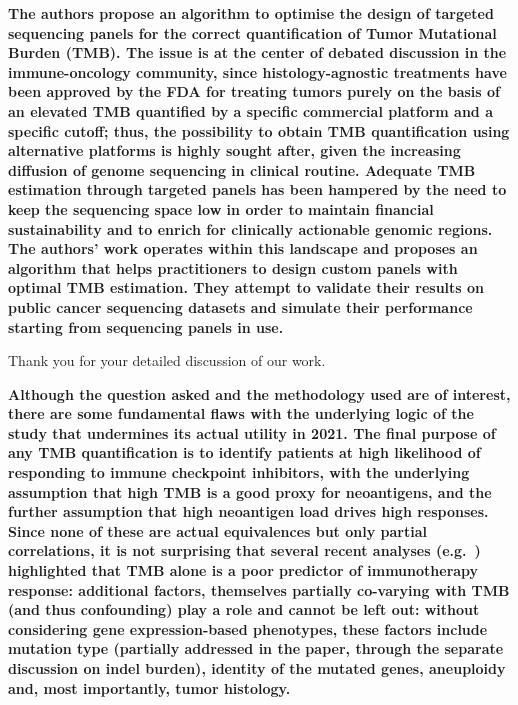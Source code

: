 \documentclass[12pt]{article}
\begin{document}
\textbf{The authors propose an algorithm to optimise the design of targeted sequencing panels for the correct quantification of Tumor Mutational Burden (TMB). The issue is at the center of debated discussion in the immune-oncology community, since histology-agnostic treatments have been approved by the FDA for treating tumors purely on the basis of an elevated TMB quantified by a specific commercial platform and a specific cutoff; thus, the possibility to obtain TMB quantification using alternative platforms is highly sought after, given the increasing diffusion of genome sequencing in clinical routine. Adequate TMB estimation through targeted panels has been hampered by the need to keep the sequencing space low in order to maintain financial sustainability and to enrich for clinically actionable genomic regions. The authors’ work operates within this landscape and proposes an algorithm that helps practitioners to design custom panels with optimal TMB estimation. They attempt to
validate their results on public cancer sequencing datasets and simulate their performance starting from sequencing panels in use.}

Thank you for your detailed discussion of our work.  

\textbf{Although the question asked and the methodology used are of interest, there are some fundamental flaws with the underlying logic of the study that undermines its actual utility in 2021. The final purpose of any TMB quantification is to identify patients at high likelihood of responding to immune checkpoint inhibitors, with the underlying assumption that high TMB is a good proxy for neoantigens, and the further assumption that high neoantigen load drives high responses. Since none of these are actual equivalences but only partial correlations, it is not surprising that several recent analyses (e.g.~\citet{litchfield2021meta}) highlighted that TMB alone is a poor predictor of immunotherapy response: additional factors, themselves partially co-varying with TMB (and thus confounding) play a role and cannot be left out: without considering gene expression-based phenotypes, these factors include mutation type (partially addressed in the paper, through the separate discussion on indel
burden), identity of the mutated genes, aneuploidy and, most importantly, tumor histology.}
\end{document}
